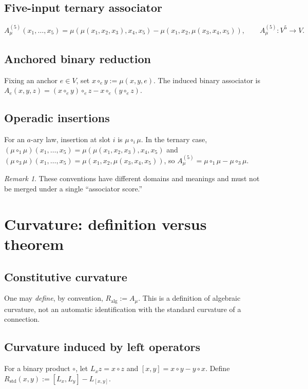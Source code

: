 \documentclass[11pt]{amsart}
\theoremstyle{definition}
\theoremstyle{remark}
\newtheorem{remark}[theorem]{Remark}
\begin{document}
\subsection{Five-input ternary associator}
\[
A_\mu^{(5)}(x_1,\ldots,x_5)
= \mu(\mu(x_1,x_2,x_3),x_4,x_5) - \mu(x_1,x_2,\mu(x_3,x_4,x_5)),
\qquad A_\mu^{(5)}: V^5\to V.
\]

\subsection{Anchored binary reduction}

Fixing an anchor $e\in V$, set $x\circ_e y := \mu(x,y,e)$. The induced
binary associator is
$A_e(x,y,z) = (x\circ_e y)\circ_e z - x\circ_e(y\circ_e z)$.

\subsection{Operadic insertions}

For an $a$-ary law, insertion at slot $i$ is $\mu\circ_i\mu$. In the
ternary case,
$(\mu\circ_1\mu)(x_1,\ldots,x_5)=\mu(\mu(x_1,x_2,x_3),x_4,x_5)$ and
$(\mu\circ_3\mu)(x_1,\ldots,x_5)=\mu(x_1,x_2,\mu(x_3,x_4,x_5))$, so
$A_\mu^{(5)} = \mu\circ_1\mu - \mu\circ_3\mu$.

\begin{remark}
These conventions have different domains and meanings and must not be
merged under a single ``associator score.''
\end{remark}

\section{Curvature: definition versus theorem}

\subsection{Constitutive curvature}

One may \emph{define}, by convention, $R_{\mathrm{alg}} := A_\mu$. This
is a definition of algebraic curvature, not an automatic identification
with the standard curvature of a connection.

\subsection{Curvature induced by left operators}

For a binary product $\circ$, let $L_x z = x\circ z$ and
$[x,y]=x\circ y - y\circ x$. Define
$R_{\mathrm{std}}(x,y) := [L_x,L_y]-L_{[x,y]}$.
\end{document}

